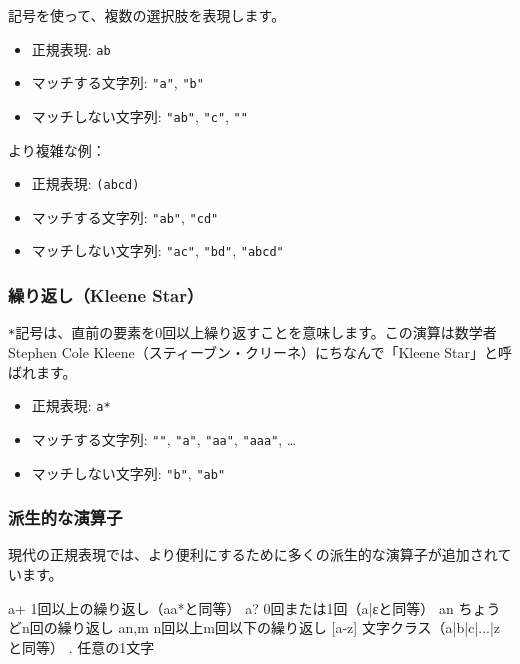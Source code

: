 \texttt{\textbar{}}記号を使って、複数の選択肢を表現します。

\begin{itemize}
\item
  正規表現: \texttt{a\textbar{}b}
\item
  マッチする文字列: \texttt{"a"}, \texttt{"b"}
\item
  マッチしない文字列: \texttt{"ab"}, \texttt{"c"}, \texttt{""}
\end{itemize}

より複雑な例：

\begin{itemize}
\item
  正規表現: \texttt{(ab\textbar{}cd)}
\item
  マッチする文字列: \texttt{"ab"}, \texttt{"cd"}
\item
  マッチしない文字列: \texttt{"ac"}, \texttt{"bd"}, \texttt{"abcd"}
\end{itemize}

\subsubsection{繰り返し（Kleene Star）}

\texttt{*}記号は、直前の要素を0回以上繰り返すことを意味します。この演算は数学者Stephen
Cole Kleene（スティーブン・クリーネ）にちなんで「Kleene
Star」と呼ばれます。

\begin{itemize}
\item
  正規表現: \texttt{a*}
\item
  マッチする文字列: \texttt{""}, \texttt{"a"}, \texttt{"aa"},
  \texttt{"aaa"}, \ldots{}
\item
  マッチしない文字列: \texttt{"b"}, \texttt{"ab"}
\end{itemize}

\subsubsection{派生的な演算子}

現代の正規表現では、より便利にするために多くの派生的な演算子が追加されています。

\begin{codescreen}{}
a+       1回以上の繰り返し（aa*と同等）
a?       0回または1回（a|εと同等）
a{n}     ちょうどn回の繰り返し
a{n,m}   n回以上m回以下の繰り返し
[a-z]    文字クラス（a|b|c|...|zと同等）
.        任意の1文字
\end{codescreen}

